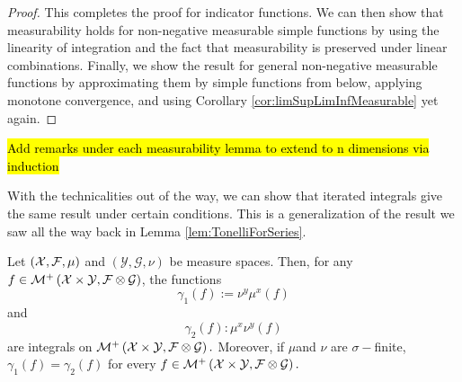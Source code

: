 \begin{proof}
This completes the proof for indicator functions. We can then show
that measurability holds for non-negative measurable simple functions
by using the linearity of integration and the fact that measurability
is preserved under linear combinations. Finally, we show the result
for general non-negative measurable functions by approximating them
by simple functions from below, applying monotone convergence, and
using Corollary \ref{cor:limSupLimInfMeasurable} yet again.
\end{proof}
\hl{Add remarks under each measurability lemma to extend to n dimensions via induction}

With the technicalities out of the way, we can show that iterated
integrals give the same result under certain conditions. This is a
generalization of the result we saw all the way back in Lemma \ref{lem:TonelliForSeries}.
\begin{thm}[Tonelli]
\label{thm:tonelli}Let $\left(\mathcal{X},\mathcal{F},\mu\right)$ and $\left(\mathcal{Y},\mathcal{G},\nu\right)$
be measure spaces. Then, for any $f\in\mathcal{M}^{+}\left(\mathcal{X}\times\mathcal{Y},\mathcal{F}\otimes\mathcal{G}\right)$,
the functions 
\[
\gamma_{1}\left(f\right):=\nu^{y}\mu^{x}\left(f\right)
\]
and
\[
\gamma_{2}\left(f\right):\mu^{x}\nu^{y}\left(f\right)
\]
are integrals on $\mathcal{M}^{+}\left(\mathcal{X}\times\mathcal{Y},\mathcal{F}\otimes\mathcal{G}\right).$
Moreover, if $\mu$and $\nu$ are $\sigma-$finite, $\gamma_{1}\left(f\right)=\gamma_{2}\left(f\right)$
for every $f\in\mathcal{M}^{+}\left(\mathcal{X}\times\mathcal{Y},\mathcal{F}\otimes\mathcal{G}\right).$
\end{thm}

